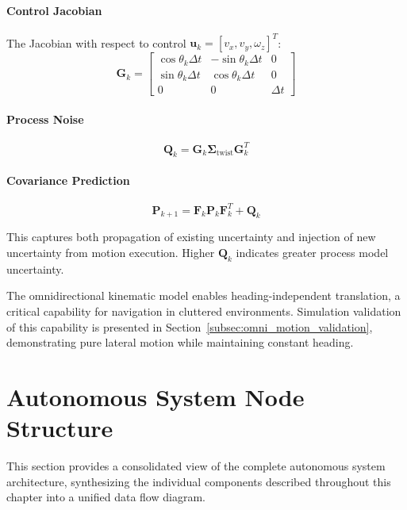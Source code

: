 \paragraph{Control Jacobian}
The Jacobian with respect to control $\mathbf{u}_k = [v_x, v_y, \omega_z]^T$:
\begin{equation}
\mathbf{G}_k = \begin{bmatrix} \cos\theta_k \Delta t & -\sin\theta_k \Delta t & 0 \\ \sin\theta_k \Delta t & \cos\theta_k \Delta t & 0 \\ 0 & 0 & \Delta t \end{bmatrix}
\label{eq:control_jacobian}
\end{equation}

\paragraph{Process Noise}
\begin{equation}
\mathbf{Q}_k = \mathbf{G}_k \boldsymbol{\Sigma}_{\text{twist}} \mathbf{G}_k^T
\label{eq:process_noise}
\end{equation}

\paragraph{Covariance Prediction}
\begin{equation}
\mathbf{P}_{k+1} = \mathbf{F}_k \mathbf{P}_k \mathbf{F}_k^T + \mathbf{Q}_k
\label{eq:covariance_prediction}
\end{equation}

This captures both propagation of existing uncertainty and injection of new uncertainty from motion execution. Higher $\mathbf{Q}_k$ indicates greater process model uncertainty.

The omnidirectional kinematic model enables heading-independent translation, a critical capability for navigation in cluttered environments. Simulation validation of this capability is presented in Section~\ref{subsec:omni_motion_validation}, demonstrating pure lateral motion while maintaining constant heading.
\newpage
\section{Autonomous System Node Structure}
\label{sec:autonomous_system_nodes}

This section provides a consolidated view of the complete autonomous system architecture, synthesizing the individual components described throughout this chapter into a unified data flow diagram.

